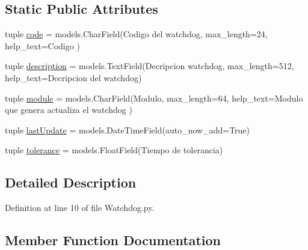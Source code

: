 \subsection*{Static Public Attributes}
\begin{DoxyCompactItemize}
\item 
tuple \hyperlink{class_ground_segment_1_1models_1_1_watchdog_1_1_watchdog_a9548413d6e37739ac54bdaa3a75d66f4}{code} = models.\+Char\+Field(\textquotesingle{}Codigo del watchdog\textquotesingle{}, max\+\_\+length=24, help\+\_\+text=\textquotesingle{}Codigo\textquotesingle{} )
\item 
tuple \hyperlink{class_ground_segment_1_1models_1_1_watchdog_1_1_watchdog_ab6bf4dee4015f39a9c62850ee3ca830e}{description} = models.\+Text\+Field(\textquotesingle{}Decripcion watchdog\textquotesingle{}, max\+\_\+length=512, help\+\_\+text=\textquotesingle{}Decripcion del watchdog\textquotesingle{})
\item 
tuple \hyperlink{class_ground_segment_1_1models_1_1_watchdog_1_1_watchdog_ad2304bdf1d4275622b13386e224550a3}{module} = models.\+Char\+Field(\textquotesingle{}Modulo\textquotesingle{}, max\+\_\+length=64, help\+\_\+text=\textquotesingle{}Modulo que genera actualiza el watchdog\textquotesingle{} )
\item 
tuple \hyperlink{class_ground_segment_1_1models_1_1_watchdog_1_1_watchdog_ac6ffa32a8b52ba04c20b99b0e4567bd5}{last\+Update} = models.\+Date\+Time\+Field(auto\+\_\+now\+\_\+add=True)
\item 
tuple \hyperlink{class_ground_segment_1_1models_1_1_watchdog_1_1_watchdog_abb2ac1834f5367e279b537108087a4f8}{tolerance} = models.\+Float\+Field(\textquotesingle{}Tiempo de tolerancia\textquotesingle{})
\end{DoxyCompactItemize}


\subsection{Detailed Description}


Definition at line 10 of file Watchdog.\+py.



\subsection{Member Function Documentation}
\hypertarget{class_ground_segment_1_1models_1_1_watchdog_1_1_watchdog_a063f49fcc21dbb4f861c2e6e291cc1bb}{}
